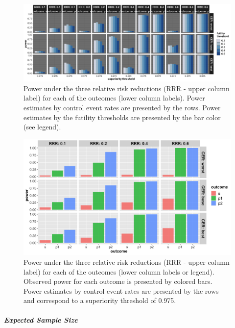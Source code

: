 \documentclass[]{article}
\let\oldsubparagraph\subparagraph
\renewcommand{\subparagraph}[1]{\oldsubparagraph{#1}\mbox{}}
\begin{document}
\begin{figure}
  \caption{Power under the three relative risk reductions (RRR - upper column label) for each of the outcomes (lower column labels). 
  Power estimates by control event rates are presented by the rows. Power estimates by the futility thresholds are presented by the bar color (see legend).}
  \includegraphics{../p1_plots/batch_size_nb_2000/power_all_p1.png}
\end{figure}

\begin{figure}
  \caption{Power under the three relative risk reductions (RRR - upper column label) for each of the outcomes (lower
  column labels or legend). Observed power for each outcome is presented by colored bars. Power estimates by control
  event rates are presented by the rows and correspond to a superiority threshold of 0.975.}
  \includegraphics{../p1_plots/batch_size_nb_2000/power_p1.png}
\end{figure}

\hypertarget{expected-sample-size-1}{%
\subparagraph{Expected Sample Size}\label{expected-sample-size-1}}
\end{document}
